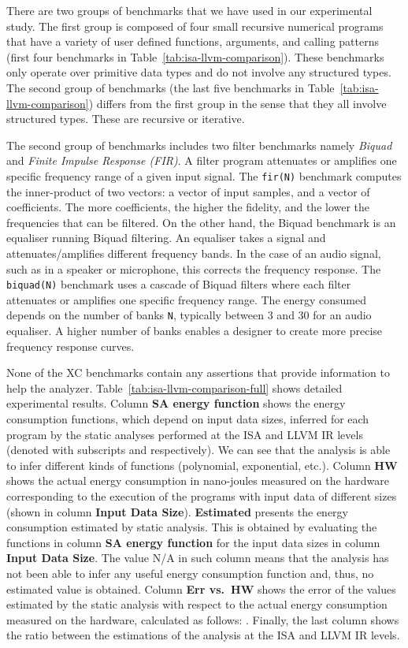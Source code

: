 \documentclass{llncs}
\newcommand{\levels}{levels\xspace}
\newcommand{\llvmir}{LLVM IR\xspace}
\begin{document}
There are two groups of benchmarks that we have used in our
experimental study.
The first group is composed of four small recursive numerical programs
that
have a variety of user defined functions, arguments, and calling
patterns (first four benchmarks in Table~\ref{tab:isa-llvm-comparison}). These benchmarks only operate over primitive data types and
do not involve any structured types.
The second group of benchmarks (the last five benchmarks in
Table~\ref{tab:isa-llvm-comparison}) differs from the first group in
the sense that they all involve structured types. These are recursive
or iterative.

The second group of benchmarks includes two filter benchmarks namely
\textit{Biquad} and \textit{Finite Impulse Response (FIR)}. A filter
program attenuates or amplifies one specific frequency range of a
given input signal.  The \texttt{fir(N)} benchmark computes the
inner-product of two vectors: a vector of input samples, and a vector
of coefficients. The more coefficients, the higher the fidelity, and
the lower the frequencies that can be filtered. On the other hand, the
Biquad benchmark is an equaliser running Biquad filtering. An
equaliser takes a signal and attenuates/amplifies different frequency
bands. In the case of an audio signal, such as in a speaker or
microphone, this corrects the frequency response. The
\texttt{biquad(N)} benchmark uses a cascade of Biquad filters where
each filter attenuates or amplifies one specific frequency range.  The
energy consumed depends on the number of banks \texttt{N}, typically
between 3 and 30 for an audio equaliser. A higher number of banks
enables a designer to create more precise frequency response curves.


None of the XC benchmarks contain any assertions that provide
information to help the analyzer.
Table~\ref{tab:isa-llvm-comparison-full} shows detailed experimental results.
Column \textbf{SA energy function} shows the energy consumption
functions, which depend on input data sizes, inferred for each program
by the static analyses performed at the ISA and \llvmir \levels
(denoted with subscripts  and  respectively). We can see
that the analysis is able to infer different kinds of functions
(polynomial, exponential, etc.). Column \textbf{HW} shows the actual
energy consumption in nano-joules measured on the hardware
corresponding to the execution of the programs with input data of
different sizes (shown in column \textbf{Input Data Size}). 
\textbf{Estimated} presents the energy consumption estimated by static
analysis. This is obtained by evaluating the functions in column \textbf{SA
  energy function} for the input data sizes in column \textbf{Input
  Data Size}. The value N/A in such column means that the analysis has
not been able to infer any useful 
energy consumption function and, thus, no
estimated value is obtained. Column \textbf{Err vs.\ HW} shows
the error of the values estimated by the static analysis with respect
to the actual energy consumption measured on the hardware, calculated as follows:
.
Finally, the last column shows the ratio between the estimations of
 the analysis at the ISA and \llvmir \levels. 
\end{document}

